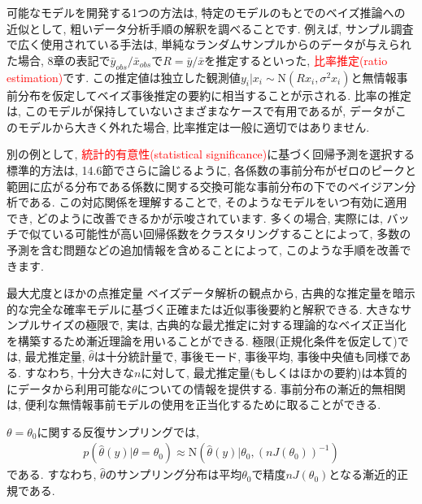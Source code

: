 \documentclass[10pt,dvipdfmx,a4]{beamer}
\newcommand{\eqn}[1]{\begin{align*}#1\end{align*}}
\newcommand{\tcr}[1]{\textcolor{red}{#1}}
\begin{document}
\begin{frame}
可能なモデルを開発する1つの方法は, 特定のモデルのもとでのベイズ推論への近似として, 粗いデータ分析手順の解釈を調べることです.
例えば, サンプル調査で広く使用されている手法は, 単純なランダムサンプルからのデータが与えられた場合, 8章の表記で$\bar{y}_{obs}/\bar{x}_{obs}$で$R=\bar{y}/\bar{x}$を推定するといった, \tcr{比率推定(ratio estimation)}です.
この推定値は独立した観測値$y_i|x_i\sim\text{N}(Rx_i, \sigma^2x_i)$と無情報事前分布を仮定してベイズ事後推定の要約に相当することが示される.
比率の推定は, このモデルが保持していないさまざまなケースで有用であるが, データがこのモデルから大きく外れた場合, 比率推定は一般に適切ではありません.

別の例として, \tcr{統計的有意性(statistical significance)}に基づく回帰予測を選択する標準的方法は, 14.6節でさらに論じるように, 各係数の事前分布がゼロのピークと範囲に広がる分布である係数に関する交換可能な事前分布の下でのベイジアン分析である.
この対応関係を理解することで, そのようなモデルをいつ有効に適用でき, どのように改善できるかが示唆されています.
多くの場合, 実際には, バッチで似ている可能性が高い回帰係数をクラスタリングすることによって, 多数の予測を含む問題などの追加情報を含めることによって, このような手順を改善できます.
\end{frame}


\begin{frame}{最大尤度とほかの点推定量}
ベイズデータ解析の観点から, 古典的な推定量を暗示的な完全な確率モデルに基づく正確または近似事後要約と解釈できる.
大きなサンプルサイズの極限で, 実は, 古典的な最尤推定に対する理論的なベイズ正当化を構築するため漸近理論を用いることができる.
極限(正規化条件を仮定して)では, 最尤推定量, $\hat{\theta}$は十分統計量で, 事後モード, 事後平均, 事後中央値も同様である.
すなわち, 十分大きな$n$に対して, 最尤推定量(もしくはほかの要約)は本質的にデータから利用可能な$\theta$についての情報を提供する.
事前分布の漸近的無相関は, 便利な無情報事前モデルの使用を正当化するために取ることができる.

$\theta=\theta_0$に関する反復サンプリングでは,
\eqn{p(\hat{\theta}(y)|\theta=\theta_0)\approx\text{N}(\hat{\theta}(y)|\theta_0, (nJ(\theta_0))^{-1})}
である.
すなわち, $\hat{\theta}$のサンプリング分布は平均$\theta_0$で精度$nJ(\theta_0)$となる漸近的正規である.
\end{frame}

\end{document}
